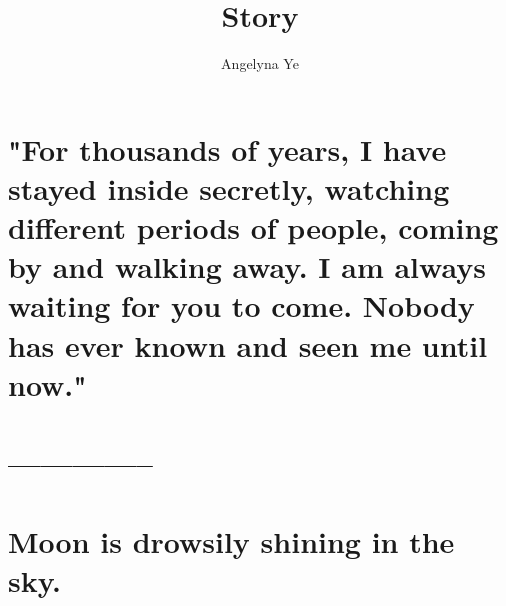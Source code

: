\documentclass{article}
\title{Story}
\author{Angelyna Ye}
\begin{document}
\maketitle

\section{"For thousands of years, I have stayed inside secretly, watching different periods of people, coming by and walking away. I am always waiting for you to come. Nobody has ever known and seen me until now."}

\section{--------------}
\section{Moon is drowsily shining in the sky.}
\end{document}
